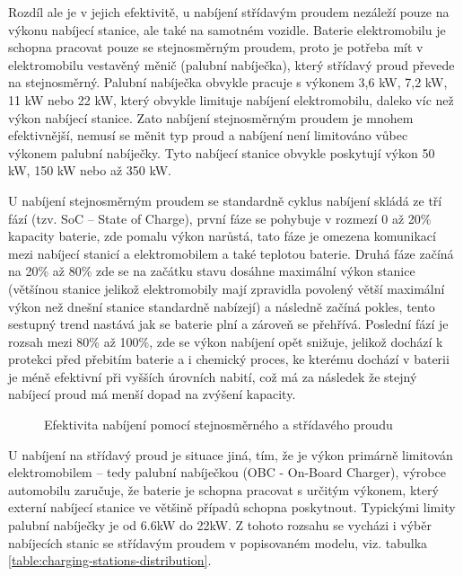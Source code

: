 \documentclass[a4paper,11pt]{article}
\begin{document}
Rozdíl ale je v jejich efektivitě, u nabíjení střídavým proudem nezáleží pouze na výkonu nabíjecí stanice, 
ale také na samotném vozidle. Baterie elektromobilu je schopna pracovat pouze se stejnosměrným proudem, 
proto je potřeba mít v elektromobilu vestavěný měnič (palubní nabíječka), který střídavý proud převede 
na stejnosměrný. Palubní nabíječka obvykle pracuje s výkonem 3,6 kW, 7,2 kW, 11 kW nebo 22 kW,
který obvykle limituje nabíjení elektromobilu, daleko víc než výkon nabíjecí stanice. \cite{nabijeni_ev}
Zato nabíjení stejnosměrným proudem je mnohem efektivnější, nemusí se měnit typ proud a nabíjení není limitováno
vůbec výkonem palubní nabíječky. Tyto nabíjecí stanice obvykle poskytují výkon 50 kW, 150 kW nebo až 350 kW.\cite{nabijeni_ev, data_brno}

U nabíjení stejnosměrným proudem se standardně cyklus nabíjení skládá ze tří fází (tzv. SoC -- State of Charge), první
fáze se pohybuje v rozmezí 0 až 20\% kapacity baterie, zde pomalu výkon narůstá, tato fáze je omezena komunikací
mezi nabíjecí stanicí a elektromobilem a také teplotou baterie. Druhá fáze začíná na 20\% až 80\% zde se na začátku
stavu dosáhne maximální výkon stanice (většínou stanice jelikož elektromobily mají zpravidla povolený větší maximální výkon
než dnešní stanice standardně nabízejí) a následně začíná pokles, tento sestupný trend nastává jak se baterie plní a
zároveň se přehřívá. Poslední fází je rozsah mezi 80\% až 100\%, zde se výkon nabíjení opět snižuje, jelikož
dochází k protekci před přebitím baterie a i chemický proces, ke kterému dochází v baterii je méně efektivní 
při vyšších úrovních nabití, což má za následek že stejný nabíjecí proud má menší dopad na zvýšení kapacity. \cite{nabijeci_krivka}

\begin{figure}[H]
    \centering
    \caption{Efektivita nabíjení pomocí stejnosměrného a střídavého proudu \cite{rozdil_mezi_ac_dc_nabijenim_graf}}
    \label{figure:ac-dc-charging-efficency}
\end{figure}

U nabíjení na střídavý proud je situace jiná, tím, že je výkon primárně limitován elektromobilem -- tedy palubní nabíječkou 
(OBC - On-Board Charger), výrobce automobilu zaručuje, že baterie je schopna pracovat s určitým výkonem, který externí
nabíjecí stanice ve většině případů schopna poskytnout. Typickými limity palubní nabíječky je od 6.6kW do 22kW. \cite{we_power_your_car_obc}
Z tohoto rozsahu se vycházi i výběr nabíjecích stanic se střídavým proudem v popisovaném modelu, viz. tabulka \ref{table:charging-stations-distribution}.
\end{document}
